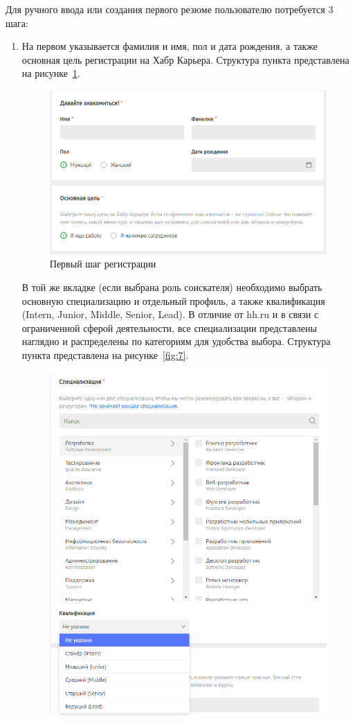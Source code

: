 \documentclass[master, och, diploma]{SCWorks}
\begin{document}
Для ручного ввода или создания первого резюме пользователю потребуется 3 шага:
\begin{enumerate}
    \item На первом указывается фамилия и имя, пол и дата рождения, а также основная цель регистрации на Хабр Карьера. Структура пункта представлена на рисунке~\ref{fig:6}.
    \begin{figure}[!ht]
        \centering
        \includegraphics[width=12cm]{images/image15.png}
        \caption{\label{fig:6}%
            Первый шаг регистрации}
    \end{figure}
    В той же вкладке (если выбрана роль соискателя) необходимо выбрать основную специализацию и отдельный профиль, а также квалификация (Intern, Junior, Middle, Senior, Lead). В отличие от hh.ru и в связи с ограниченной сферой деятельности, все специализации представлены наглядно и распределены по категориям для удобства выбора. Структура пункта представлена на рисунке~\ref{fig:7}.
    \begin{figure}[!ht]
        \centering
        \includegraphics[width=12cm]{images/image6.png}

\end{figure}
\end{enumerate}
\end{document}
